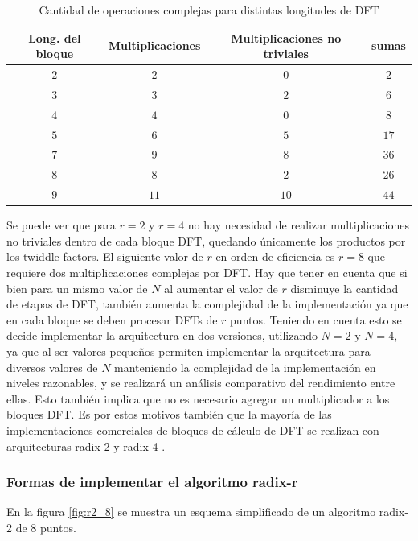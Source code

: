 \begin{table}[h]
\begin{tabular}{c c c c}
\textbf{Long. del bloque} & \textbf{Multiplicaciones} & \textbf{Multiplicaciones no triviales} &
\textbf{sumas} \\ \hline 
$2$ & $2$ & $0$ & $2$ \\
$3$ & $3$ & $2$ & $6$ \\
$4$ & $4$ & $0$ & $8$ \\
$5$ & $6$ & $5$ & $17$ \\
$7$ & $9$ & $8$ & $36$ \\
$8$ & $8$ & $2$ & $26$ \\
$9$ & $11$ & $10$ & $44$ \\ \hline
\end{tabular}
\caption{Cantidad de operaciones complejas para distintas longitudes de DFT}
\label{table:fft_oper}
\end{table}

Se puede ver que para $r=2$ y $r=4$ no hay necesidad de realizar multiplicaciones no triviales
dentro de cada bloque DFT, quedando únicamente los productos por los twiddle factors. El siguiente
valor de $r$ en orden de eficiencia es $r=8$ que requiere dos multiplicaciones complejas por DFT.
Hay que tener en cuenta que si bien para un mismo valor de $N$ al aumentar el valor de $r$
disminuye la cantidad de etapas de DFT, también aumenta la complejidad de la implementación ya que
en cada bloque se deben procesar DFTs de $r$ puntos.
Teniendo en cuenta esto se decide implementar la arquitectura en dos versiones, utilizando $N=2$ y
$N=4$, ya que al ser valores pequeños permiten implementar la arquitectura para diversos valores de
$N$ manteniendo la complejidad de la implementación en niveles razonables, y se realizará un
análisis comparativo del rendimiento entre ellas.
Esto también implica que no es necesario agregar un multiplicador a los bloques DFT. Es por estos
motivos también que la mayoría de las implementaciones comerciales de bloques de cálculo de DFT se realizan con 
arquitecturas radix-2 y radix-4 \cite{radix_meyer}.

\subsubsection{Formas de implementar el algoritmo radix-r}\label{sec:radix}

En la figura \ref{fig:r2_8} se muestra un esquema simplificado de un algoritmo radix-2 de 8 puntos. 

